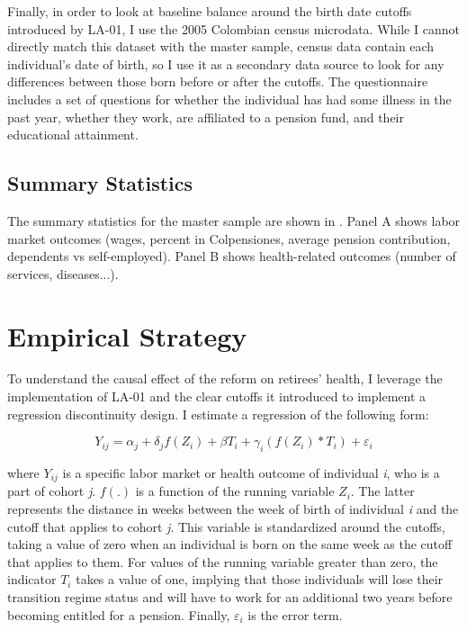 \documentclass[12pt, a4paper]{article}
\begin{document}
Finally, in order to look at baseline balance around the birth date cutoffs introduced by LA-01, I use the 2005 Colombian census microdata. While I cannot directly match this dataset with the master sample, census data contain each individual's date of birth, so I use it as a secondary data source to look for any differences between those born before or after the cutoffs. The questionnaire includes a set of questions for whether the individual has had some illness in the past year, whether they work, are affiliated to a pension fund, and their educational attainment. 


\subsection{Summary Statistics}
The summary statistics for the master sample are shown in . Panel A shows labor market outcomes (wages, percent in Colpensiones, average pension contribution, dependents vs self-employed). Panel B shows health-related outcomes (number of services, diseases...).


\section{Empirical Strategy \label{sec:strategy}}

To understand the causal effect of the reform on retirees' health, I leverage the implementation of LA-01 and the clear cutoffs it introduced to implement a regression discontinuity design. I estimate a regression of the following form:

\begin{equation}
    Y_{ij} = \alpha_j + \delta_j f(Z_{i}) + \beta T_i + \gamma_i (f(Z_i)*T_i) + \varepsilon_i
\end{equation}

\noindent where $Y_{ij}$ is a specific labor market or health outcome of individual \textit{i}, who is a part of cohort \textit{j}. $f(.)$ is a function of the running variable $Z_i$. The latter represents the distance in weeks between the week of birth of individual \textit{i} and the cutoff that applies to cohort \textit{j}. This variable is standardized around the cutoffs, taking a value of zero when an individual is born on the same week as the cutoff that applies to them. For values of the running variable greater than zero, the indicator $T_i$ takes a value of one, implying that those individuals will lose their transition regime status and will have to work for an additional two years before becoming entitled for a pension. Finally, $\varepsilon_i$ is the error term.
\end{document}
